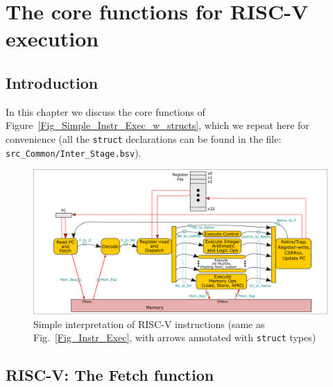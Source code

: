 

\chapter{The core functions for RISC-V execution}


\setcounter{page}{1}
\renewcommand{\thepage}{\arabic{chapter}-\arabic{page}}

\label{ch_core_functions}


\section{Introduction}

In this chapter we discuss the core functions of
Figure~\ref{Fig_Simple_Instr_Exec_w_structs}, which we repeat here for
convenience (all the \verb|struct| declarations can be found in the
file: \verb|src_Common/Inter_Stage.bsv|).
\begin{figure}[htbp]
  \centerline{\includegraphics[width=6in,angle=0]{ch030_RISCV_Design_Space/Figures/Fig_Instr_Exec_w_structs}}
  \caption{\label{Fig_Fetch_function_Simple_Instr_Exec}Simple interpretation of RISC-V instructions (same as Fig.~\ref{Fig_Instr_Exec}, with arrows annotated with {\tt struct} types)}
\end{figure}


\section{RISC-V: The Fetch function}

